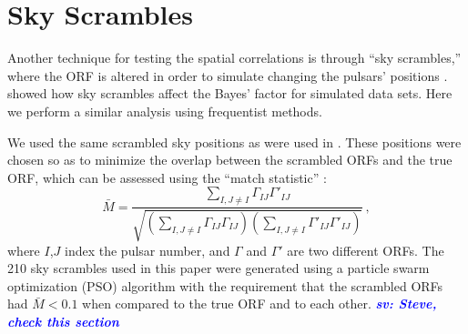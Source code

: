 \documentclass[twocolumn,aps,prd,superscriptaddress]{revtex4-1}
\newcommand{\sv}[1]{\textcolor{blue}{\it{\textbf{sv: #1}}} }
\begin{document}
\section{Sky Scrambles}
\label{sec:skyscrambles}

Another technique for testing the spatial correlations is through ``sky scrambles,'' 
where the ORF is altered in order to simulate changing the pulsars' positions \citep{cs2016}. 
\citet{tlb+2017} showed how sky scrambles affect the Bayes' factor for simulated data sets. 
Here we perform a similar analysis using frequentist methods.

We used the same scrambled sky positions as were used in \citet{tlb+2017}. 
These positions were chosen so as to minimize the overlap  
between the scrambled ORFs and the true ORF, 
which can be assessed using the ``match statistic'' \citep{cs2016}:
\begin{equation}
	\bar{M} = \frac{\sum_{I,J \neq I} \Gamma_{IJ} \Gamma'_{IJ}}{\sqrt{ \left( \sum_{I, J \neq I} \Gamma_{IJ} \Gamma_{IJ} \right) \left( \sum_{I, J \neq I} \Gamma'_{IJ} \Gamma'_{IJ} \right)}} \,,
\end{equation}
where $I$,$J$ index the pulsar number, and $\Gamma$ and $\Gamma'$ are two different ORFs. 
The 210 sky scrambles used in this paper were generated using a particle swarm optimization (PSO) algorithm 
with the requirement that the scrambled ORFs had $\bar{M} < 0.1$ when compared to the true ORF and to each other.
\sv{Steve, check this section}
\end{document}

